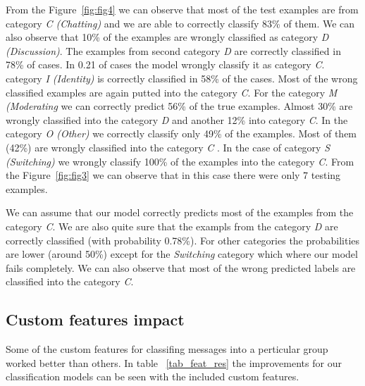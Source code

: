 \documentclass[11pt,a4paper]{article}
\begin{document}
From the Figure~\ref{fig:fig4} we can observe that most of the test examples are from category \textit{C (Chatting)} and we are able to correctly classify 83\% of them.
We can also observe that 10\% of the examples are wrongly classified as category \textit{D (Discussion)}.
The examples from second category \textit{D} are correctly classified in 78\% of cases.
In 0.21 of cases the model wrongly classify it as category \textit{C}.
category \textit{I (Identity)} is correctly classified in 58\% of the cases.
Most of the wrong classified examples are again putted into the category \textit{C}.
For the category \textit{M (Moderating} we can correctly predict 56\% of the true examples.
Almost 30\% are wrongly classified into the category \textit{D} and another 12\% into category \textit{C}.
In the category \textit{O (Other)} we correctly classify only 49\% of the examples.
Most of them (42\%) are wrongly classified into the category \textit{C }.
In the case of category \textit{S (Switching)} we wrongly classify 100\% of the examples into the category \textit{C}.
From the Figure~\ref{fig:fig3} we can observe that in this case there were only 7 testing examples.

We can assume that our model correctly predicts most of the examples from the category \textit{C}.
We are also quite sure that the exampls from the category \textit{D} are correctly classified (with probability 0.78\%).
For other categories the probabilities are lower (around 50\%) except for the \textit{Switching} category which where our model fails completely.
We can also observe that most of the wrong predicted labels are classified into the category \textit{C}.


\subsection{Custom features impact}

Some of the custom features for classifing messages into a perticular group worked better than others.
In table ~\ref{tab_feat_res} the improvements for our classification models can be seen with the included custom features.
\end{document}
